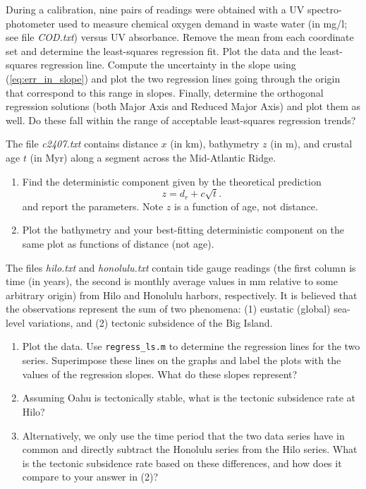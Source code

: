 \begin{problem}
During a calibration, nine pairs of readings were obtained with a UV spectro-photometer used to measure chemical oxygen demand
in waste water (in mg/l; see file \emph{COD.txt}) versus UV absorbance.  Remove the mean from each coordinate set and
determine the least-squares regression fit.
Plot the data and the least-squares regression line.  Compute the
uncertainty in the slope using (\ref{eq:err_in_slope}) and plot the two regression lines going through the origin that
correspond to this range in slopes.  Finally, determine the orthogonal regression solutions (both Major Axis and Reduced Major Axis)
and plot them as well.  Do these fall within the
range of acceptable least-squares regression trends?
\end{problem}

\begin{problem}
	\setcounter{Conrad}{\theproblem}
	\setcounter{Conradchap}{\thechapter}
The file \emph{c2407.txt} contains distance $x$ (in km), bathymetry $z$ (in m), and crustal age $t$ (in Myr) along a
segment across the Mid-Atlantic Ridge.  
\begin{enumerate}[label=\alph*)]
\item	Find the deterministic component given by the theoretical prediction
$$
z = d_r + c \sqrt{t}.
$$ 
	and report the parameters.  Note $z$ is a function of age, not distance.
\item	Plot the bathymetry and your best-fitting deterministic component on the same plot as functions of distance (not age).
\end{enumerate}
\end{problem}

\begin{problem}
\setcounter{RSL}{\theproblem}
The files \emph{hilo.txt} and \emph{honolulu.txt} contain tide gauge 
readings (the first column is time (in years), the second is monthly average values in mm relative to some
arbitrary origin) from Hilo and Honolulu harbors, respectively.  It is 
believed that the observations represent the sum of two phenomena: (1) eustatic (global) sea-level 
variations, and (2) tectonic subsidence of the Big Island.
\begin{enumerate}[label=\alph*)]
\item Plot the data.  Use \texttt{regress\_ls.m} to determine the regression lines for the two series.  Superimpose 
these lines on the graphs and label the plots with the values of the regression slopes.  What do 
these slopes represent?
\item Assuming Oahu is tectonically stable, what is the tectonic subsidence rate at Hilo?
\item Alternatively, we only use the time period that the two data series have in common and directly 
subtract the Honolulu series from the Hilo series.  What is the tectonic subsidence rate based on 
these differences, and how does it compare to your answer in (2)?
\end{enumerate}
\end{problem}

